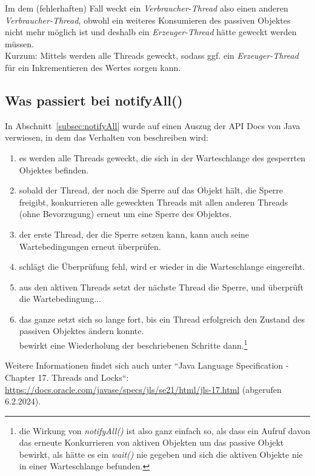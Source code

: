 \noindent
Im dem (fehlerhaften) Fall weckt ein \textit{Verbraucher-Thread} also einen anderen \textit{Verbraucher-Thread}, obwohl ein weiteres Konsumieren des passiven Objektes nicht mehr möglich ist und deshalb ein \textit{Erzeuger-Thread} hätte geweckt werden müssen.\\

\noindent
Kurzum: Mittels  werden alle Threads geweckt, sodass ggf. ein \textit{Erzeuger-Thread} für ein Inkrementieren des Wertes sorgen kann.

\subsection*{Was passiert bei notifyAll()}

In Abschnitt~\ref{subsec:notifyAll} wurde auf einen Auszug der API Docs von Java verwiesen, in dem das Verhalten von  beschreiben wird:

\begin{enumerate}
    \item es werden alle Threads geweckt, die sich in der Warteschlange des gesperrten Objektes befinden.
    \item sobald der Thread, der noch die Sperre auf das Objekt hält, die Sperre freigibt, konkurrieren alle geweckten Threads mit allen anderen Threads (ohne Bevorzugung) erneut um eine Sperre des Objektes.
    \item der erste Thread, der die Sperre setzen kann, kann auch seine Wartebedingungen erneut überprüfen.
    \item schlägt die Überprüfung fehl, wird er wieder in die Warteschlange eingereiht.
    \item aus den aktiven Threads setzt der nächste Thread die Sperre, und überprüft die Wartebedingung...
    \item das ganze setzt sich so lange fort, bis ein Thread erfolgreich den Zustand des passiven Objektes ändern konnte.\\
     bewirkt eine Wiederholung der beschriebenen Schritte dann.\footnote{
        die Wirkung von \textit{notifyAll()} ist also ganz einfach so, als dass ein Aufruf davon das erneute Konkurrieren von aktiven Objekten um das passive Objekt bewirkt, als hätte es ein \textit{wait()} nie gegeben und sich die aktiven Objekte nie in einer Warteschlange befunden.
    }
\end{enumerate}

Weitere Informationen findet sich auch unter ``Java Language Specification - Chapter 17. Threads and Locks``: \url{https://docs.oracle.com/javase/specs/jls/se21/html/jls-17.html} (abgerufen 6.2.2024).